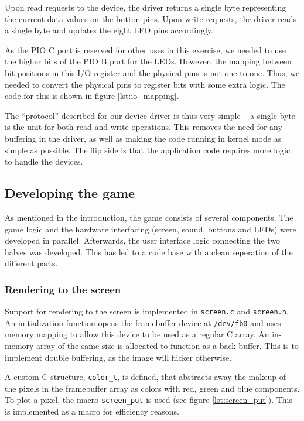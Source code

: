 Upon read requests to the device, the driver returns a single byte
representing the current data values on the button pins. Upon write
requests, the driver reads a single byte and updates the eight LED pins
accordingly.

As the PIO C port is reserved for other uses in this exercise, we needed
to use the higher bits of the PIO B port for the LEDs. However, the
mapping between bit positions in this I/O register and the physical pins
is not one-to-one. Thus, we needed to convert the physical pins to
register bits with some extra logic. The code for this is shown in
figure \ref{lst:io_mapping}.



The ``protocol'' described for our device driver is thus very simple --
a single byte is the unit for both read and write operations. This
removes the need for any buffering in the driver, as well as making the
code running in kernel mode as simple as possible. The flip side is that
the application code requires more logic to handle the devices.

\subsection{Developing the game}

As mentioned in the introduction, the game consists of several components. The
game logic and the hardware interfacing (screen, sound, buttons and
LEDs) were developed in parallel. Afterwards, the user interface logic
connecting the two halves was developed. This has led to a code base
with a clean seperation of the different parts.

\subsubsection{Rendering to the screen}

Support for rendering to the screen is implemented in \texttt{screen.c}
and \texttt{screen.h}. An initialization function opens the framebuffer
device at \texttt{/dev/fb0} and uses memory mapping to allow this device
to be used as a regular C array. An in-memory array of the same size is
allocated to function as a back buffer. This is to implement double
buffering, as the image will flicker otherwise.

A custom C structure, \texttt{color\_t}, is defined, that abstracts away
the makeup of the pixels in the framebuffer array as colors with red,
green and blue components. To plot a pixel, the macro
\texttt{screen\_put} is used (see figure \ref{lst:screen_put}). This is
implemented as a macro for efficiency reasons.

